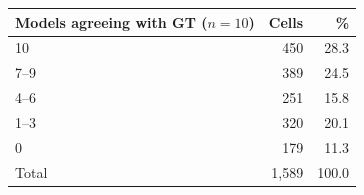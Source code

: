 \begin{tabular}{lrr}
\toprule
Models agreeing with GT ($n = 10$) & Cells & \% \\
\midrule
10 & 450 & 28.3 \\
7–9 & 389 & 24.5 \\
4–6 & 251 & 15.8 \\
1–3 & 320 & 20.1 \\
0 & 179 & 11.3 \\
\midrule
Total & 1,589 & 100.0 \\
\bottomrule
\end{tabular}
